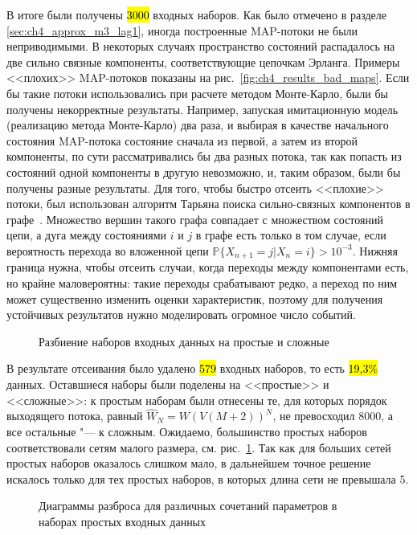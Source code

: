 В итоге были получены \hl{3000} входных наборов. Как было отмечено в разделе \ref{sec:ch4_approx_m3_lag1}, иногда построенные MAP-потоки не были неприводимыми. В некоторых случаях пространство состояний распадалось на две сильно связные компоненты, соответствующие цепочкам Эрланга. Примеры <<плохих>> MAP-потоков показаны на рис.~\ref{fig:ch4_results_bad_maps}. Если бы такие потоки использовались при расчете методом Монте-Карло, были бы получены некорректные результаты. Например, запуская имитационную модель (реализацию метода Монте-Карло) два раза, и выбирая в качестве начального состояния MAP-потока состояние сначала из первой, а затем из второй компоненты, по сути рассматривались бы два разных потока, так как попасть из состояний одной компоненты в другую невозможно, и, таким образом, были бы получены разные результаты. Для того, чтобы быстро отсеить <<плохие>> потоки, был использован алгоритм Тарьяна поиска сильно-связных компонентов в графе~\cite{tarjan72}. Множество вершин такого графа совпадает с множеством состояний цепи, а дуга между состояниями $i$ и $j$ в графе есть только в том случае, если вероятность перехода во вложенной цепи $\mathbb{P}\{X_{n+1} = j | X_n = i\} > 10^{-3}$. Нижняя граница нужна, чтобы отсеить случаи, когда переходы между компонентами есть, но крайне маловероятны: такие переходы срабатывают редко, а переход по ним может существенно изменить оценки характеристик, поэтому для получения устойчивых результатов нужно моделировать огромное число событий.

\begin{figure}[h]
  \caption{Разбиение наборов входных данных на простые и сложные}\label{fig:ch4_complexity_split}
\end{figure}

В результате отсеивания было удалено \hl{579} входных наборов, то есть \hl{19,3\%} данных. Оставшиеся наборы были поделены на <<простые>> и <<сложные>>: к простым наборам были отнесены те, для которых порядок выходящего потока, равный $\hat{W}_N = W(V(M+2))^N$, не превосходил 8000, а все остальные "--- к сложным. Ожидаемо, большинство простых наборов соответствовали сетям малого размера, см. рис.~\ref{fig:ch4_complexity_split}. Так как для больших сетей простых наборов оказалось слишком мало, в дальнейшем точное решение искалось только для тех простых наборов, в которых длина сети не превышала 5.

\begin{figure}[h]
  \caption{Диаграммы разброса для различных сочетаний параметров в наборах простых входных данных}\label{fig:ch4_input_scatter}
\end{figure}

